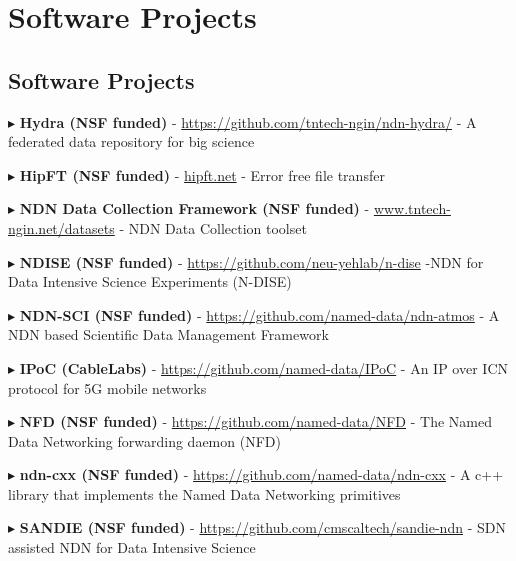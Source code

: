 
\section{Software Projects}
\subsection{Software Projects}
\begin{cvlist}

\item $\blacktriangleright$  \textbf{Hydra  (NSF  funded)} -  \url{https://github.com/tntech-ngin/ndn-hydra/} - A federated data repository for big science


\item $\blacktriangleright$  \textbf{HipFT (NSF funded)} -  \url{hipft.net} - Error free file transfer 

\item $\blacktriangleright$  
\textbf{NDN Data Collection Framework (NSF funded)} -  \url{www.tntech-ngin.net/datasets} - NDN Data Collection toolset

\item $\blacktriangleright$  \textbf{NDISE (NSF  funded)} -  \url{https://github.com/neu-yehlab/n-dise} -NDN for Data Intensive Science Experiments (N-DISE) 



\item $\blacktriangleright$  \textbf{NDN-SCI (NSF  funded)} -  \url{https://github.com/named-data/ndn-atmos} - A NDN based Scientific Data Management Framework

\item $\blacktriangleright$ \textbf{IPoC (CableLabs)} - \url{https://github.com/named-data/IPoC} - An IP over ICN protocol for 5G mobile networks

\item $\blacktriangleright$ \textbf{NFD  (NSF  funded)} - \url{https://github.com/named-data/NFD} - The Named Data Networking forwarding daemon (NFD)


\item $\blacktriangleright$ \textbf{ndn-cxx  (NSF  funded)} - \url{https://github.com/named-data/ndn-cxx} - A c++ library that implements the Named Data Networking primitives


\item $\blacktriangleright$ \textbf{SANDIE  (NSF  funded)} - \url{https://github.com/cmscaltech/sandie-ndn} - SDN assisted NDN for Data Intensive Science
\end{cvlist}
